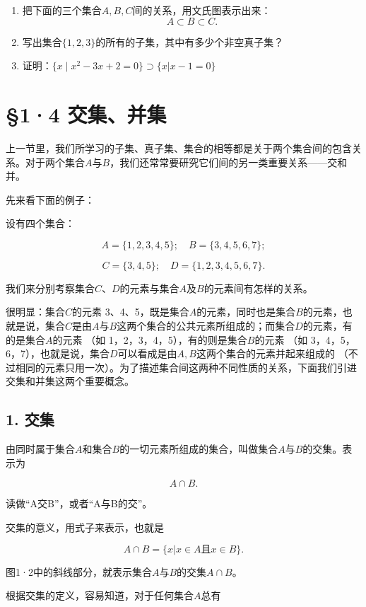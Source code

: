 \begin{enumerate}[start=2]
\item
  把下面的三个集合\(A, B, C\)间的关系，用文氏图表示出来：
\[
A \subset B \subset C.
\]
\item
  写出集合\(\{1, 2, 3\}\)的所有的子集，其中有多少个非空真子集？
\item
  证明：\(\{x\mid x^2 -3x + 2 = 0\} \supset \{x|x - 1 = 0\}\)
\end{enumerate}

\section{§1·4 交集、并集}

上一节里，我们所学习的子集、真子集、集合的相等都是关于两个集合间的包含关系。对于两个集合\(A\)与\(B\)，我们还常常要研究它们间的另一类重要关系------交和并。

先来看下面的例子：

设有四个集合：

\[
A = \{1, 2, 3, 4, 5 \}; \quad B = \{3, 4, 5, 6, 7 \};
\]

\[
C = \{3, 4, 5 \}; \quad D = \{1, 2, 3, 4, 5, 6, 7 \}.
\]

我们来分别考察集合\(C\)、\(D\)的元素与集合\(A\)及\(B\)的元素间有怎样的关系。

很明显：集合\(C\)的元素
3、4、5，既是集合\(A\)的元素，同时也是集合\(B\)的元素，也就是说，集合\(C\)是由\(A\)与\(B\)这两个集合的公共元素所组成的；而集合\(D\)的元素，有的是集合\(A\)的元素
（如 1，2，3，4，5），有的则是集合\(B\)的元素 （如
3，4，5，6，7），也就是说，集合\(D\)可以看成是由\(A, B\)这两个集合的元素并起来组成的
（不过相同的元素只用一次）。为了描述集合间这两种不同性质的关系，下面我们引进交集和并集这两个重要概念。

\subsection{1. 交集}

由同时属于集合\(A\)和集合\(B\)的一切元素所组成的集合，叫做集合\(A\)与\(B\)的交集。表示为

\[
A \cap B.
\]

读做``A交B''，或者``A与B的交''。

交集的意义，用式子来表示，也就是

\[
A \cap B = \{x | x \in A \text{且} x \in B \}.
\]

图1·2中的斜线部分，就表示集合\(A\)与\(B\)的交集\(A \cap B\)。

根据交集的定义，容易知道，对于任何集合\(A\)总有

